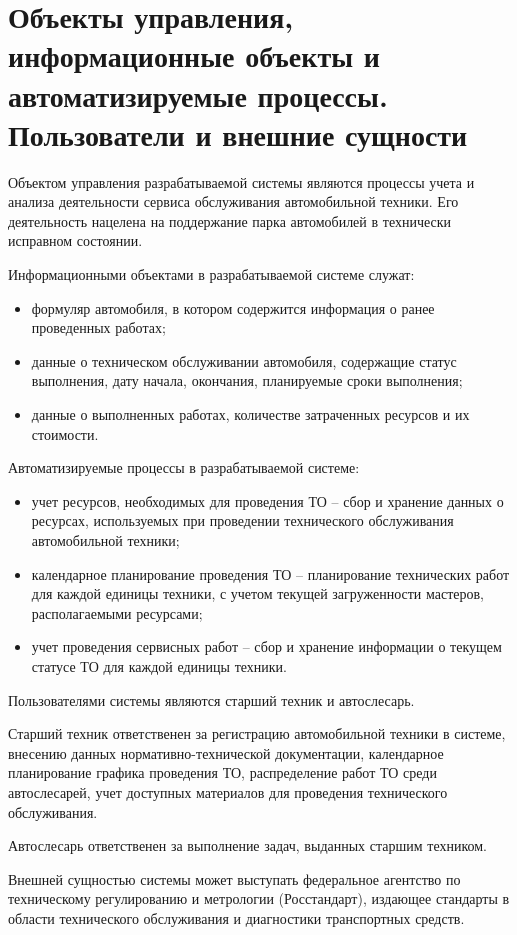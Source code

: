 \section{Объекты управления, информационные объекты и автоматизируемые процессы.
  Пользователи и внешние сущности}
Объектом управления разрабатываемой системы являются процессы учета и анализа
деятельности сервиса обслуживания автомобильной техники.
Его деятельность нацелена на поддержание парка автомобилей в технически
исправном состоянии.

Информационными объектами в разрабатываемой системе служат:
\begin{itemize}
	\item формуляр автомобиля, в котором содержится информация о ранее
        проведенных работах;
	\item данные о техническом обслуживании автомобиля, содержащие статус
        выполнения, дату начала, окончания, планируемые сроки выполнения;
	\item данные о выполненных работах, количестве затраченных ресурсов и
        их стоимости.
\end{itemize}

Автоматизируемые процессы в разрабатываемой системе:
\begin{itemize}
	\item учет ресурсов, необходимых для проведения ТО -- сбор и хранение данных
		о ресурсах, используемых при проведении технического обслуживания
		автомобильной техники;
	\item календарное планирование проведения ТО -- планирование технических
		работ для каждой единицы техники, с учетом текущей загруженности
		мастеров, располагаемыми ресурсами;
	\item учет проведения сервисных работ -- сбор и хранение информации о
		текущем статусе ТО для каждой единицы техники.
\end{itemize}

Пользователями системы являются старший техник и автослесарь.

Старший техник ответственен за регистрацию автомобильной техники в системе,
внесению данных нормативно-технической документации, календарное планирование
графика проведения ТО, распределение работ ТО среди автослесарей, учет доступных
материалов для проведения технического обслуживания.

Автослесарь ответственен за выполнение задач, выданных старшим техником.

Внешней сущностью системы может выступать федеральное агентство по техническому
регулированию и метрологии (Росстандарт), издающее стандарты в области
технического обслуживания и диагностики транспортных средств.
